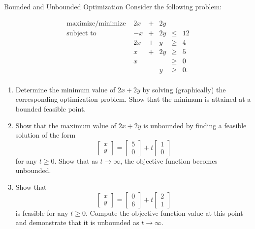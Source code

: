 \begin{ex}{Bounded and Unbounded Optimization}{}
Consider the following problem:

\[
\begin{array}{rrcllll}
\text{maximize/minimize } & 2x & + & 2y \\
\text{subject to} & -x & + & 2y & \leq & 12 \\
& 2x & + & y & \geq & 4 \\
& x & + & 2y & \geq & 5 \\
& x & & & \geq & 0 \\
& & & y & \geq & 0. \\
\end{array}
\]

\begin{enumerate}

\item Determine the minimum value of \(2x + 2y\) by solving (graphically) the corresponding optimization problem. Show that the minimum is attained at a bounded feasible point.

\item Show that the maximum value of \(2x + 2y\) is unbounded by finding a feasible solution of the form
\[
\begin{bmatrix} x \\ y \end{bmatrix} = \begin{bmatrix} 5\\ 0\end{bmatrix} + t \begin{bmatrix} 1\\ 0\end{bmatrix}
\]
for any \(t \geq 0\). Show that as \(t \to \infty\), the objective function becomes unbounded.

\item Show that
\[
\begin{bmatrix} x \\ y \end{bmatrix} = \begin{bmatrix} 0 \\ 6 \end{bmatrix} + t\begin{bmatrix} 2 \\ 1 \end{bmatrix}
\]
is feasible for any \(t \geq 0\). Compute the objective function value at this point and demonstrate that it is unbounded as \(t \to \infty\).

\end{enumerate}
\exrefs{\S\ref{sec:unbounded-regions}}
\end{ex}

